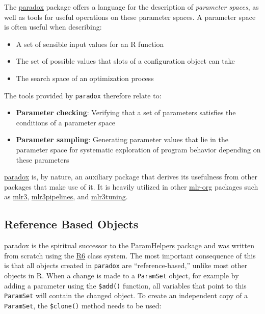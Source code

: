 \documentclass[
]{scrbook}
\providecommand{\tightlist}{%
  \setlength{\itemsep}{0pt}\setlength{\parskip}{0pt}}
\begin{document}
The \href{https://paradox.mlr-org.com}{paradox} package offers a language for the description of \emph{parameter spaces}, as well as tools for useful operations on these parameter spaces.
A parameter space is often useful when describing:

\begin{itemize}
\tightlist
\item
  A set of sensible input values for an R function
\item
  The set of possible values that slots of a configuration object can take
\item
  The search space of an optimization process
\end{itemize}

The tools provided by \texttt{paradox} therefore relate to:

\begin{itemize}
\tightlist
\item
  \textbf{Parameter checking}: Verifying that a set of parameters satisfies the conditions of a parameter space
\item
  \textbf{Parameter sampling}: Generating parameter values that lie in the parameter space for systematic exploration of program behavior depending on these parameters
\end{itemize}

\href{https://paradox.mlr-org.com}{paradox} is, by nature, an auxiliary package that derives its usefulness from other packages that make use of it.
It is heavily utilized in other \href{https://github.com/mlr-org}{mlr-org} packages such as \href{https://mlr3.mlr-org.com}{mlr3}, \href{https://mlr3pipelines.mlr-org.com}{mlr3pipelines}, and \href{https://mlr3tuning.mlr-org.com}{mlr3tuning}.

\hypertarget{reference-based-objects}{%
\subsection{Reference Based Objects}\label{reference-based-objects}}

\href{https://paradox.mlr-org.com}{paradox} is the spiritual successor to the \href{https://cran.r-project.org/package=ParamHelpers}{ParamHelpers} package and was written from scratch using the \href{https://cran.r-project.org/package=R6}{R6} class system.
The most important consequence of this is that all objects created in \texttt{paradox} are ``reference-based,'' unlike most other objects in R.
When a change is made to a \texttt{ParamSet} object, for example by adding a parameter using the \texttt{\$add()} function, all variables that point to this \texttt{ParamSet} will contain the changed object.
To create an independent copy of a \texttt{ParamSet}, the \texttt{\$clone()} method needs to be used:
\end{document}
